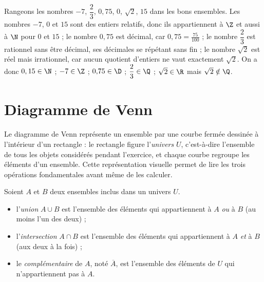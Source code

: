\begin{exemple}
Rangeons les nombres $-7$, $\dfrac{2}{3}$, $0{,}75$, $0$, $\sqrt{2}$, $15$ dans les bons ensembles. Les nombres $-7$, $0$ et $15$ sont des entiers relatifs, donc ils appartiennent à $\Z$ et aussi à $\N$ pour $0$ et $15$ ; le nombre $0{,}75$ est décimal, car $0{,}75 = \tfrac{75}{100}$ ; le nombre $\dfrac{2}{3}$ est rationnel sans être décimal, ses décimales se répétant sans fin ; le nombre $\sqrt{2}$ est réel mais irrationnel, car aucun quotient d'entiers ne vaut exactement $\sqrt{2}$. On a donc $0, 15 \in \N$ ; $-7 \in \Z$ ; $0{,}75 \in \D$ ; $\dfrac{2}{3} \in \Q$ ; $\sqrt{2} \in \R$ mais $\sqrt{2} \notin \Q$.
\end{exemple}

\section{Diagramme de Venn}

Le diagramme de Venn représente un ensemble par une courbe fermée dessinée à l'intérieur d'un rectangle : le rectangle figure l'\emph{univers} $U$, c'est-à-dire l'ensemble de tous les objets considérés pendant l'exercice, et chaque courbe regroupe les éléments d'un ensemble. Cette représentation visuelle permet de lire les trois opérations fondamentales avant même de les calculer.

\begin{definition}
Soient $A$ et $B$ deux ensembles inclus dans un univers $U$.
\begin{itemize}
  \item l'\emph{union} $A \cup B$ est l'ensemble des éléments qui appartiennent à $A$ \emph{ou} à $B$ (au moins l'un des deux) ;
  \item l'\emph{intersection} $A \cap B$ est l'ensemble des éléments qui appartiennent à $A$ \emph{et} à $B$ (aux deux à la fois) ;
  \item le \emph{complémentaire} de $A$, noté $\overline{A}$, est l'ensemble des éléments de $U$ qui n'appartiennent pas à $A$.
\end{itemize}
\end{definition}

